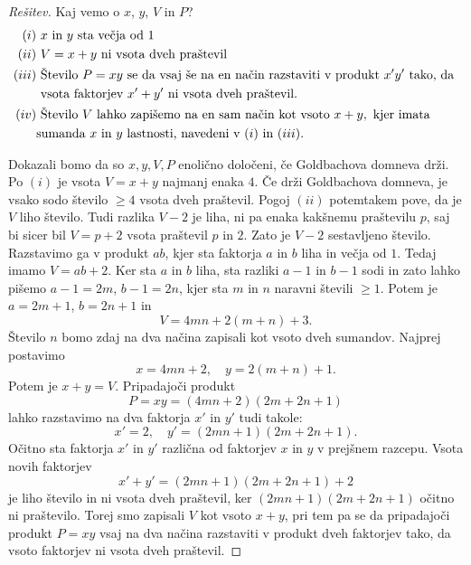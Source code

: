 \documentclass{amsart}
\begin{document}
\begin{proof}[Rešitev]
    Kaj vemo o $x$, $y$, $V$ in $P$?
    \begin{align*}
    (i)&\textnormal{ } x \textnormal{ in } y \textnormal{ sta večja od } 1\\
    (ii)&\textnormal{ } V= x+y \textnormal{ ni vsota dveh praštevil}\\
    (iii)& \textnormal{ Število }P=xy\textnormal{ se da vsaj še na en način razstaviti v produkt }x'y'\textnormal{ tako, da }\\
    &\textnormal{ vsota faktorjev }x'+y' \textnormal{ ni vsota dveh praštevil.}\\
    (iv)&\textnormal{ Število } V \textnormal{ lahko zapišemo na en sam način kot vsoto }x+y,\textnormal{ kjer imata}\\
    & \textnormal{sumanda }
    x \textnormal{ in } y \textnormal{ lastnosti, navedeni v }(i)\textnormal{ in }(iii). \\
    \end{align*}

    Dokazali bomo da so $x, y, V, P$ enolično določeni, če Goldbachova domneva drži.\\

    Po $(i)$ je  vsota $V = x + y$ najmanj enaka $4$. Če drži Goldbachova domneva, je vsako sodo število $\geq 4$ vsota  dveh 
    praštevil. Pogoj $(ii)$ potemtakem pove, da je $V$ liho število. Tudi razlika $V - 2$ je liha, ni pa enaka kakšnemu 
    praštevilu $p$, saj bi sicer bil $V = p + 2$ vsota praštevil $p$ in $2$. Zato je $V - 2$ sestavljeno število. Razstavimo 
    ga v produkt $ab$, kjer sta faktorja $a$ in $b$ liha in večja  od $1$. Tedaj imamo $V = ab + 2$. Ker sta $a$ in $b$ liha, 
    sta razliki $a - 1$ in $b - 1$ sodi in zato lahko pišemo $a - 1 = 2m$, $b - 1 = 2n$, kjer sta $m$ in $n$ naravni števili 
    $\geq 1$. Potem je $a = 2m + 1$, $b = 2n + 1$ in 
    \begin{equation} \label{en1}%
        V = 4mn + 2(m + n) + 3.
    \end{equation}
    Število $n$ bomo zdaj na dva načina zapisali 
    kot vsoto dveh sumandov. Najprej postavimo $$x = 4mn+2,\quad y= 2(m+n) + 1.$$ Potem je $x + y = V$. Pripadajoči produkt 
    $$P = xy = (4mn + 2) (2m + 2n + 1)$$ lahko razstavimo na dva faktorja $x'$ in $y'$ tudi takole: $$x' = 2, \quad y' = (2mn + 1)
    (2m + 2n + 1).$$ Očitno sta faktorja $x'$ in $y'$ različna od faktorjev $x$ in $y$ v prejšnem razcepu. Vsota novih faktorjev 
    $$x' + y' = (2mn + 1)(2m + 2n + 1)+2$$ je liho število in ni vsota dveh praštevil, ker $(2mn+1)(2m+2n+1)$ očitno ni 
    praštevilo. Torej smo zapisali $V$ kot vsoto $x + y$, pri tem pa se da pripadajoči produkt $P = xy$ vsaj na dva načina 
    razstaviti v produkt dveh faktorjev tako, da vsoto faktorjev ni vsota dveh praštevil.


\end{proof}
\end{document}
